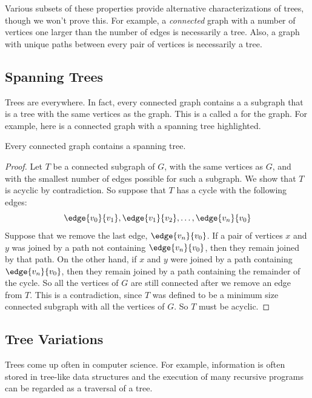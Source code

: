 Various subsets of these properties provide alternative characterizations
of trees, though we won't prove this.  For example, a \emph{connected}
graph with a number of vertices one larger than the number of edges is
necessarily a tree.  Also, a graph with unique paths between every pair of
vertices is necessarily a tree.


\subsection{Spanning Trees}

Trees are everywhere.  In fact, every connected graph contains a a
subgraph that is a tree with the same vertices as the graph.  This is a
called a  for the graph.  For example, here is a
connected graph with a spanning tree highlighted.


\begin{theorem}
Every connected graph contains a spanning tree.
\end{theorem}

\begin{proof}
Let $T$ be a connected subgraph of $G$, with the same vertices as $G$, and
with the smallest number of edges possible for such a subgraph.  We show
that $T$ is acyclic by contradiction.  So suppose that $T$ has a cycle
with the following edges:
\[
\edge{v_0}{v_1}, \edge{v_1}{v_2}, \dots, \edge{v_n}{v_0}
\]
Suppose that we remove the last edge, $\edge{v_n}{v_0}$.  If a pair of
vertices $x$ and $y$ was joined by a path not containing
$\edge{v_n}{v_0}$, then they remain joined by that path.  On the other
hand, if $x$ and $y$ were joined by a path containing $\edge{v_n}{v_0}$,
then they remain joined by a path containing the remainder of the cycle.
So all the vertices of $G$ are still connected after we remove an edge
from $T$.  This is a contradiction, since $T$ was defined to be a minimum
size connected subgraph with all the vertices of $G$.  So $T$ must be
acyclic.
\end{proof}



\iffalse

\subsection{Tree Variations}

Trees come up often in computer science.  For example, information is
often stored in tree-like data structures and the execution of many
recursive programs can be regarded as a traversal of a tree.

